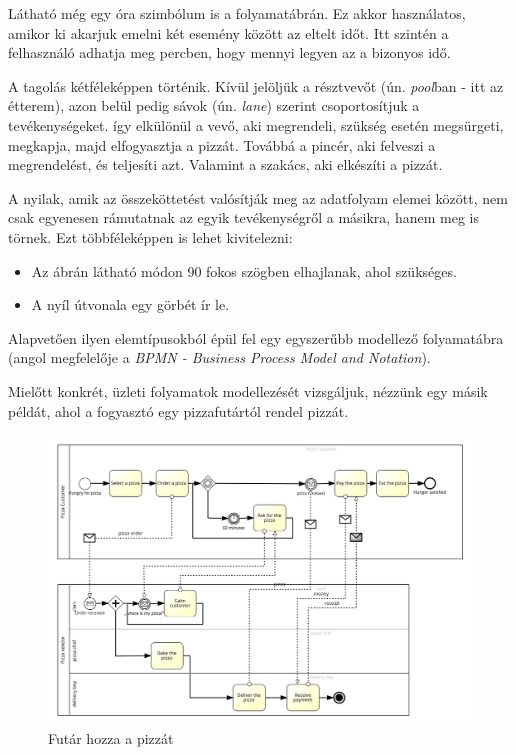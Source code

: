 \documentclass[a4paper]{article}
\begin{document}
Látható még egy óra szimbólum is a folyamatábrán. Ez akkor használatos, amikor ki akarjuk emelni két esemény között az eltelt időt. Itt szintén a felhasználó adhatja meg percben, hogy mennyi legyen az a bizonyos idő.

A tagolás kétféleképpen történik. Kívül jelöljük a résztvevőt (ún. \textit{pool}ban - itt az étterem), azon belül pedig sávok (ún. \textit{lane}) szerint csoportosítjuk a tevékenységeket. így elkülönül a vevő, aki megrendeli, szükség esetén megsürgeti, megkapja, majd elfogyasztja a pizzát. Továbbá a pincér, aki felveszi a megrendelést, és teljesíti azt. Valamint a szakács, aki elkészíti a pizzát.

A nyilak, amik az összeköttetést valósítják meg az adatfolyam elemei között, nem csak egyenesen rámutatnak az egyik tevékenységről a másikra, hanem meg is törnek. Ezt többféleképpen is lehet kivitelezni:

\begin{itemize}
\item Az ábrán látható módon 90 fokos szögben elhajlanak, ahol szükséges.
\item A nyíl útvonala egy görbét ír le.
\end{itemize}

Alapvetően ilyen elemtípusokból épül fel egy egyszerűbb modellező folyamatábra (angol megfelelője a \textit{BPMN - Business Process Model and Notation}).

Mielőtt konkrét, üzleti folyamatok modellezését vizsgáljuk, nézzünk egy másik példát, ahol a fogyasztó egy pizzafutártól rendel pizzát.

\newpage

\begin{figure}[h]
\centering
\includegraphics[width=16truecm]{pizzadeliv.png}
\caption{Futár hozza a pizzát}
\end{figure}
\end{document}
